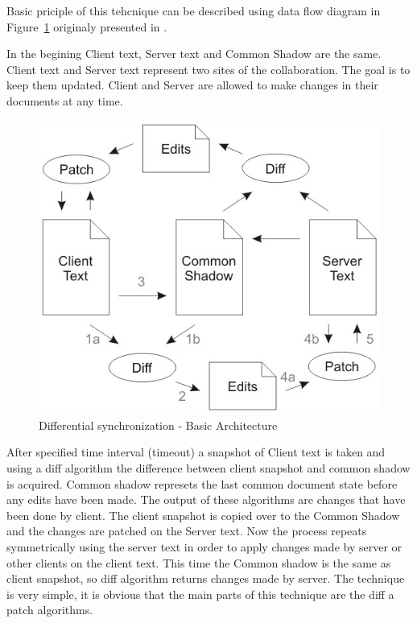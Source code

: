 \documentclass[12pt,oneside]{fithesis2}
\begin{document}
\par Basic priciple of this tehcnique can be described using data flow diagram in Figure~\ref{fig:ds1} originaly presented in \cite{Fraser}.  
\par In the begining Client text, Server text and Common Shadow are the same. Client text and Server text represent two sites of the collaboration. The goal is to keep them updated. Client and Server are allowed to make changes in their documents at any time. 
\begin{figure}[H]
\caption{Differential synchronization - Basic Architecture \cite{Fraser}}
\label{fig:ds1}
\centering
\vspace{5mm}
\includegraphics[scale=0.55]{diff1}
\end{figure}
After specified time interval (timeout) a snapshot of Client text is taken and using a diff algorithm the difference between client snapshot and common shadow is acquired. Common shadow represets the last common document state before any edits have been made. The output of these algorithms are changes that have been done by client. The client snapshot is copied over to the Common Shadow and the changes are patched on the Server text. Now the process repeats symmetrically using the server text in order to apply changes made by server or other clients on the client text. This time the Common shadow is the same as client snapshot, so diff algorithm returns changes made by server. The technique is very simple, it is obvious that the main parts of this technique are the diff a patch algorithms.
\end{document}

